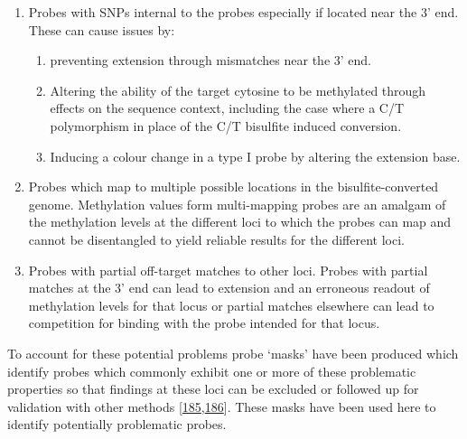 \documentclass[
]{book}
\providecommand{\tightlist}{%
  \setlength{\itemsep}{0pt}\setlength{\parskip}{0pt}}
\begin{document}
\begin{enumerate}
\def\labelenumi{\arabic{enumi}.}
\tightlist
\item
  Probes with SNPs internal to the probes especially if located near the 3' end.
  These can cause issues by:

  \begin{enumerate}
  \def\labelenumii{\alph{enumii})}
  \tightlist
  \item
    preventing extension through mismatches near the 3' end.
  \item
    Altering the ability of the target cytosine to be methylated through effects on the sequence context, including the case where a C/T polymorphism in place of the C/T bisulfite induced conversion.
  \item
    Inducing a colour change in a type I probe by altering the extension base.
  \end{enumerate}
\item
  Probes which map to multiple possible locations in the bisulfite-converted genome.
  Methylation values form multi-mapping probes are an amalgam of the methylation levels at the different loci to which the probes can map and cannot be disentangled to yield reliable results for the different loci.
\item
  Probes with partial off-target matches to other loci.
  Probes with partial matches at the 3' end can lead to extension and an erroneous readout of methylation levels for that locus or partial matches elsewhere can lead to competition for binding with the probe intended for that locus.
\end{enumerate}

To account for these potential problems probe `masks' have been produced which identify probes which commonly exhibit one or more of these problematic properties so that findings at these loci can be excluded or followed up for validation with other methods {[}\protect\hyperlink{ref-Pidsley2016}{185},\protect\hyperlink{ref-Zhou2017}{186}{]}.
These masks have been used here to identify potentially problematic probes.
\end{document}
